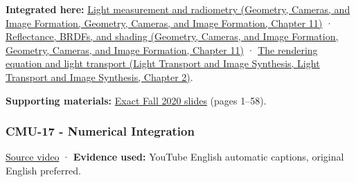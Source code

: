 \textbf{Integrated here:} \href{../03-Geometry-Cameras-and-Image-Formation/main.pdf\#nameddest=03-visual-computing-i-ch004-light-measurement-and-radiometry}{Light measurement and radiometry (Geometry, Cameras, and Image Formation, Geometry, Cameras, and Image Formation, Chapter 11)} · \href{../03-Geometry-Cameras-and-Image-Formation/main.pdf\#nameddest=03-visual-computing-i-ch004-reflectance-brdfs-and-shading}{Reflectance, BRDFs, and shading (Geometry, Cameras, and Image Formation, Geometry, Cameras, and Image Formation, Chapter 11)} · \href{../04-Light-Transport-and-Image-Synthesis/main.pdf\#nameddest=03-visual-computing-i-ch007-the-rendering-equation-and-light-transport}{The rendering equation and light transport (Light Transport and Image Synthesis, Light Transport and Image Synthesis, Chapter 2)}.

\textbf{Supporting materials:} \href{https://15462.courses.cs.cmu.edu/fall2020content/lectures/16_renderingequation/16_renderingequation_slides.pdf}{Exact Fall 2020 slides} (pages 1--58).

\subsubsection{CMU-17 - Numerical Integration}\label{04-visual-computing-ii-ch036-cmu-17---numerical-integration}

\href{https://www.youtube.com/watch?v=EGNZm9m382s}{Source video} · \textbf{Evidence used:} YouTube English automatic captions, original English preferred.

